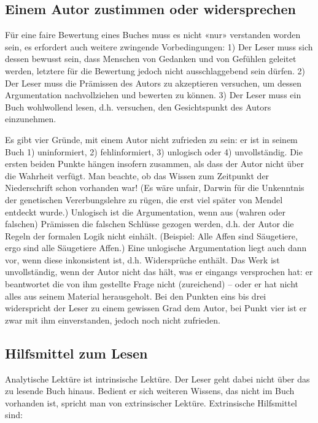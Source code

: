 \documentclass[a4paper,12pt]{scrartcl}
\begin{document}
\subsection{Einem Autor zustimmen oder widersprechen}

Für eine faire Bewertung eines Buches muss es nicht «nur» verstanden worden sein, es erfordert auch weitere zwingende Vorbedingungen: 1) Der Leser muss sich dessen bewusst sein, dass Menschen von Gedanken und von Gefühlen geleitet werden, letztere für die Bewertung jedoch nicht ausschlaggebend sein dürfen. 2) Der Leser muss die Prämissen des Autors zu akzeptieren versuchen, um dessen Argumentation nachvollziehen und bewerten zu können. 3) Der Leser muss ein Buch wohlwollend lesen, d.h. versuchen, den Gesichtspunkt des Autors einzunehmen.

Es gibt vier Gründe, mit einem Autor nicht zufrieden zu sein: er ist in seinem Buch 1) uninformiert, 2) fehlinformiert, 3) unlogisch oder 4) unvollständig. Die ersten beiden Punkte hängen insofern zusammen, als dass der Autor nicht über die Wahrheit verfügt. Man beachte, ob das Wissen zum Zeitpunkt der Niederschrift schon vorhanden war! (Es wäre unfair, Darwin für die Unkenntnis der genetischen Vererbungslehre zu rügen, die erst viel später von Mendel entdeckt wurde.) Unlogisch ist die Argumentation, wenn aus (wahren oder falschen) Prämissen die falschen Schlüsse gezogen werden, d.h. der Autor die Regeln der formalen Logik nicht einhält. (Beispiel: Alle Affen sind Säugetiere, ergo sind alle Säugetiere Affen.) Eine unlogische Argumentation liegt auch dann vor, wenn diese inkonsistent ist, d.h. Widersprüche enthält. Das Werk ist unvollständig, wenn der Autor nicht das hält, was er eingangs versprochen hat: er beantwortet die von ihm gestellte Frage nicht (zureichend) – oder er hat nicht alles aus seinem Material herausgeholt. Bei den Punkten eins bis drei widerspricht der Leser zu einem gewissen Grad dem Autor, bei Punkt vier ist er zwar mit ihm einverstanden, jedoch noch nicht zufrieden.

\subsection{Hilfsmittel zum Lesen}

Analytische Lektüre ist intrinsische Lektüre. Der Leser geht dabei nicht über das zu lesende Buch hinaus. Bedient er sich weiteren Wissens, das nicht im Buch vorhanden ist, spricht man von extrinsischer Lektüre. Extrinsische Hilfsmittel sind:
\end{document}

